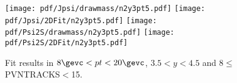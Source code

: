 \begin{figure}[H]
\begin{center}
\texttt{[image: pdf/Jpsi/drawmass/n2y3pt5.pdf]}
\texttt{[image: pdf/Jpsi/2DFit/n2y3pt5.pdf]}
\vspace*{-0.5cm}
\texttt{[image: pdf/Psi2S/drawmass/n2y3pt5.pdf]}
\texttt{[image: pdf/Psi2S/2DFit/n2y3pt5.pdf]}
\vspace*{-0.5cm}
\end{center}
\caption{Fit results in $8\gevc<pt<20\gevc$, $3.5<y<4.5$ and 8$\leq$PVNTRACKS$<$15.}
\label{Fitn2y3pt5}
\end{figure}

